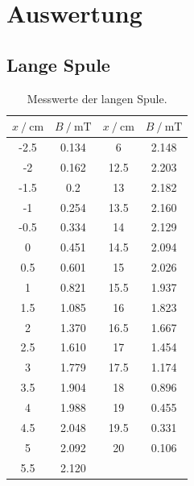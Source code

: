 \section{Auswertung}
\label{sec:Auswertung}

\subsection{Lange Spule}

\FloatBarrier

\begin{table}
\centering
\caption{Messwerte der langen Spule.}
\begin{tabular}{cc|cc}
  \toprule
  $x \:/\: \si{\centi\meter}$ & $B \:/\: \si{\milli\tesla}$ & $x \:/\: \si{\centi\meter}$ & $B \:/\: \si{\milli\tesla}$ \\
  \midrule
  -2.5 & 0.134 &  6 & 2.148  \\
  -2 & 0.162 & 12.5 & 2.203 \\
  -1.5 & 0.2 &  13 & 2.182 \\
  -1 & 0.254 & 13.5 & 2.160 \\
  -0.5 & 0.334 &  14 & 2.129 \\ 
  0 & 0.451  & 14.5 & 2.094 \\
  0.5 & 0.601 & 15 & 2.026 \\
  1 & 0.821  & 15.5 & 1.937 \\
  1.5 & 1.085  & 16 & 1.823 \\
  2 & 1.370  & 16.5 & 1.667 \\
  2.5 & 1.610  &  17 & 1.454 \\
  3 & 1.779  & 17.5 & 1.174 \\
  3.5 & 1.904  & 18 & 0.896 \\
  4 & 1.988 & 19 & 0.455 \\
  4.5 & 2.048  &  19.5 & 0.331 \\
  5 & 2.092  & 20 & 0.106 \\
  5.5 & 2.120 & & \\
  \bottomrule
\end{tabular}
\label{tab:long}
\end{table}

